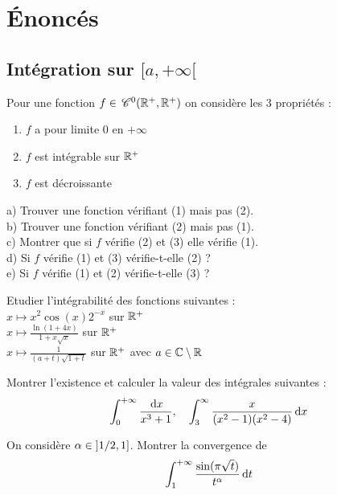 \section{Énoncés}

\subsection{Intégration sur \texorpdfstring{$[a,+\infty[$}{[a, +infini[}}

\begin{exercice}
Pour une fonction $f\in \,\mathscr C^{0}(\mathbb{R}^{+},\mathbb{R}^{+})$ on considère les 3 propriétés :
\begin{enumerate}
    \item[(1)] $f$ a pour limite 0 en $+\infty$
    \item[(2)] $f$ est intégrable sur $\mathbb{R}^{+}$
    \item[(3)] $f$ est décroissante
\end{enumerate}
a) Trouver une fonction vérifiant (1) mais pas (2). \\
b) Trouver une fonction vérifiant (2) mais pas (1). \\
c) Montrer que si $f$ vérifie (2) et (3) elle vérifie (1). \\
d) Si $f$ vérifie (1) et (3) vérifie-t-elle (2) ? \\
e) Si $f$ vérifie (1) et (2) vérifie-t-elle (3) ?
\end{exercice}

\begin{exercice}
Etudier l'intégrabilité des fonctions suivantes : \\
$x\mapsto x^{2}\cos(x)2^{-x}$ sur $\mathbb{R}^{+}$ \\
$x\mapsto \frac{\ln(1+4x)}{1+x\sqrt{x}}$ sur $\mathbb{R}^{+}$ \\
$x\mapsto \frac{1}{(a+t)\sqrt{1+t}}$ sur $\mathbb{R}^{+}$ avec $a\in\mathbb{C}\setminus\mathbb{R}$
\end{exercice}

\begin{exercice}
Montrer l'existence et calculer la valeur des intégrales suivantes :
$$ \int_{0}^{+\infty}\frac{\,\mathrm{d}x}{x^{3}+1}, \quad \int_{3}^{\infty}\frac{x}{(x^{2}-1)(x^{2}-4)}\,\mathrm{d}x $$
\end{exercice}

\begin{exercice}
On considère $\alpha\in\left]1/2, 1\right]$. Montrer la convergence de
$$ \int_{1}^{+\infty}\frac{\sin(\pi\sqrt{t})}{t^{\alpha}}\,\mathrm{d}t $$
\end{exercice}

